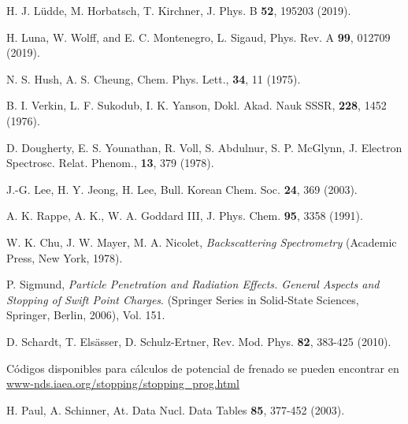 \begin{thebibliography}{9}
H. J. L\"udde, M. Horbatsch, T. Kirchner,
J. Phys. B \textbf{52}, 195203 (2019).

H. Luna, W. Wolff, and E. C. Montenegro, L. Sigaud, 
Phys. Rev. A \textbf{99}, 012709 (2019).

N. S. Hush, A. S. Cheung,  
Chem. Phys. Lett., \textbf{34}, 11 (1975).

B. I. Verkin, L. F. Sukodub, I. K. Yanson, 
Dokl. Akad. Nauk SSSR, \textbf{228}, 1452 (1976).

D. Dougherty, E. S. Younathan, R. Voll, S. Abdulnur, S. P. McGlynn,
J. Electron Spectrosc. Relat. Phenom., \textbf{13}, 379 (1978).

J.-G. Lee, H. Y. Jeong, H. Lee, 
Bull. Korean Chem. Soc. \textbf{24}, 369 (2003).

A. K. Rappe, A. K., W. A. Goddard III,
J. Phys. Chem. \textbf{95}, 3358 (1991).




W. K. Chu, J. W. Mayer, M. A. Nicolet,
\textit{Backscattering Spectrometry}
(Academic Press, New York, 1978).

P. Sigmund, 
\textit{Particle Penetration and Radiation Effects. General Aspects and 
Stopping of Swift Point Charges}.
(Springer Series in Solid-State Sciences, Springer, Berlin, 2006), Vol. 151.

D. Schardt, T. Els\"asser, D. Schulz-Ertner, 
Rev. Mod. Phys. \textbf{82},  383-425 (2010).

Códigos disponibles para cálculos de potencial de frenado se pueden 
encontrar en \href{https://www-nds.iaea.org/stopping/stopping\_prog.html}
{www-nds.iaea.org/stopping/stopping\_prog.html}

H. Paul, A. Schinner,
At. Data Nucl. Data Tables  \textbf{85}, 377-452 (2003).


\end{thebibliography}
